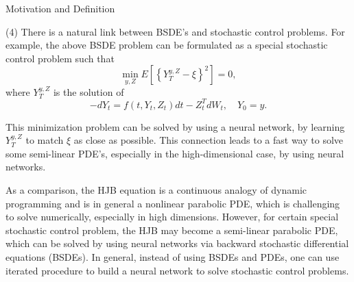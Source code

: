 \documentclass{beamer}
\begin{document}
\begin{frame}{Motivation and Definition}

    {\footnotesize \footnotesize
(4) There is a natural link between BSDE's and stochastic control problems. 
For example, the above BSDE problem can be formulated as a special 
stochastic control problem such that
\[
\min_{y,Z} E \left[ \left\{ Y_T^{y,Z} - \xi \right\}^2 \right] = 0,
\]
where \( Y_T^{y,Z} \) is the solution of
\[
-dY_t = f(t, Y_t, Z_t)dt - Z_t^T dW_t, \quad Y_0 = y.
\]

 \pause This minimization problem can be solved by using a neural network, 
by learning \( Y_T^{y,Z} \) to match \( \xi \) as close as possible. 
This connection leads to a fast way to 
solve some semi-linear PDE's, especially in the high-dimensional case, by using neural networks.
\vspace{1em}
\par  \pause As a comparison, the HJB equation is a continuous analogy of dynamic programming and 
is in general a nonlinear parabolic PDE, which is challenging to solve numerically, 
especially in high dimensions. However, for certain special stochastic control problem, 
the HJB may become a semi-linear parabolic PDE, which 
can be solved by using neural networks via backward stochastic differential equations (BSDEs).
In general, instead of using BSDEs and PDEs, 
one can use iterated procedure to build a neural network to
 solve stochastic control problems.
    }
    
\end{frame}
\end{document}
